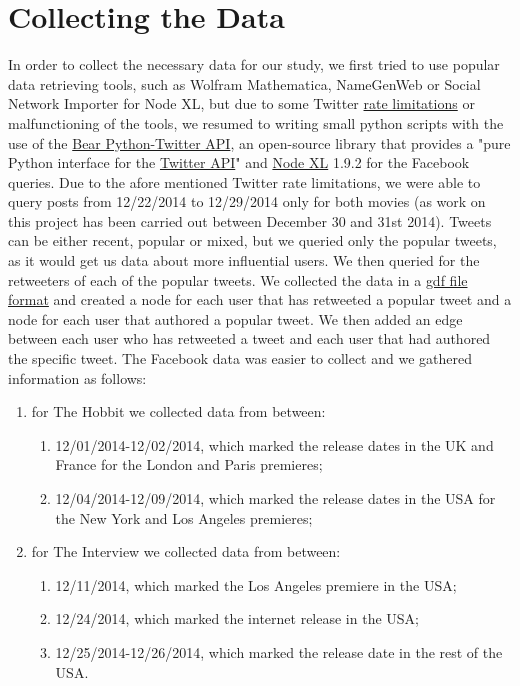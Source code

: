 \documentclass{llncs}
\begin{document}
\section{Collecting the Data}
In order to collect the necessary data for our study, we first tried to use
popular data retrieving tools, such as Wolfram Mathematica, NameGenWeb or Social
Network Importer for Node XL, but due to some Twitter
\href{https://dev.twitter.com/rest/public/rate-limiting}{rate limitations} or
malfunctioning of the tools, we resumed to writing small python scripts with the
use of the \href{https://github.com/bear/python-twitter}{Bear Python-Twitter
API}, an open-source library that provides a "pure Python interface for the
\href{https://dev.twitter.com/rest/public}{Twitter API}" and
\href{http://nodexl.codeplex.com/}{Node XL} 1.9.2 for
the Facebook queries. Due to the afore mentioned Twitter rate limitations, we
were able to query posts from 12/22/2014 to 12/29/2014 only for both movies (as
work on this project has been carried out between December 30 and 31st 2014).
Tweets can be either recent, popular or mixed, but we queried only the
popular tweets, as it would get us data about more influential users. We then
queried for the retweeters of each of the popular tweets. We collected the data
in a \href{https://gephi.org/users/supported-graph-formats/gdf-format/}{gdf file
format} and created a node for each user that has retweeted a popular tweet and
a node for each user that authored a popular tweet. We then added an edge
between each user who has retweeted a tweet and each user that had authored the
specific tweet. The Facebook data was easier to collect and we gathered
information as follows:
\begin{enumerate}
\item for The Hobbit we collected data from between:
    \begin{enumerate}
    \item 12/01/2014-12/02/2014, which marked the release dates in the UK and
        France for the London and Paris premieres;
    \item 12/04/2014-12/09/2014, which marked the release dates in the USA for
        the New York and Los Angeles premieres;
    \end{enumerate}
\item for The Interview we collected data from between:
    \begin{enumerate}
    \item 12/11/2014, which marked the Los Angeles premiere in the USA;
    \item 12/24/2014, which marked the internet release in the USA;
    \item 12/25/2014-12/26/2014, which marked the release date in the rest of
        the USA.
    \end{enumerate}
\end{enumerate}
\end{document}
